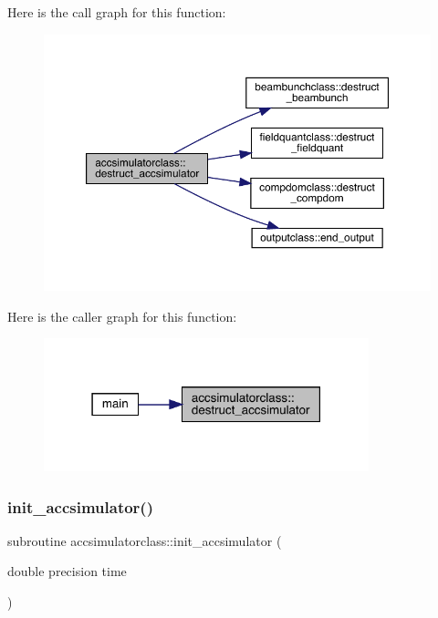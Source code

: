 Here is the call graph for this function\+:\nopagebreak
\begin{figure}[H]
\begin{center}
\leavevmode
\includegraphics[width=350pt]{namespaceaccsimulatorclass_a7bcc6275f447513b2ea5d85d46aade2a_cgraph}
\end{center}
\end{figure}
Here is the caller graph for this function\+:\nopagebreak
\begin{figure}[H]
\begin{center}
\leavevmode
\includegraphics[width=267pt]{namespaceaccsimulatorclass_a7bcc6275f447513b2ea5d85d46aade2a_icgraph}
\end{center}
\end{figure}
\mbox{\label{namespaceaccsimulatorclass_a6a90186281758191cfa3ef4fc9c54078}} 
\subsubsection{\texorpdfstring{init\_accsimulator()}{init\_accsimulator()}}
{\footnotesize\ttfamily subroutine accsimulatorclass\+::init\+\_\+accsimulator (\begin{DoxyParamCaption}\item[{double precision}]{time }\end{DoxyParamCaption})}



